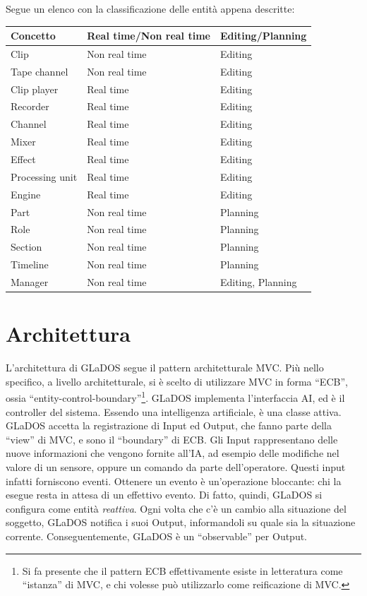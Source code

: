 \documentclass[a4paper,12pt]{report}
\begin{document}
Segue un elenco con la classificazione delle entità appena descritte:
\begin{center}
\begin{longtable}{| m{7em} | m{6cm} | m{5cm} |} 
 \hline
 Concetto & Real time/Non real time & Editing/Planning \\ [0.5ex] 
 \hline
 Clip & Non real time & Editing \\ 
 \hline
 Tape channel & Non real time & Editing \\
 \hline
 Clip player & Real time & Editing \\
 \hline
 Recorder & Real time & Editing \\
 \hline
 Channel & Real time & Editing \\ 
 \hline
 Mixer & Real time & Editing \\
 \hline 
 Effect & Real time & Editing \\
 \hline
 Processing unit & Real time & Editing \\
 \hline
 Engine & Real time & Editing \\
 \hline
 Part & Non real time & Planning \\
 \hline
 Role & Non real time & Planning \\
\hline
 Section & Non real time & Planning \\
\hline
 Timeline & Non real time & Planning \\
\hline
 Manager & Non real time & Editing, Planning \\
\hline
\end{longtable}
\end{center}


\section{Architettura}
L'architettura di GLaDOS segue il pattern architetturale MVC.
%
Più nello specifico, a livello architetturale, si è scelto di utilizzare MVC in forma ``ECB'', ossia ``entity-control-boundary''\footnote{
Si fa presente che il pattern ECB effettivamente esiste in letteratura come ``istanza'' di MVC, e chi volesse può utilizzarlo come reificazione di MVC.
}.
%
GLaDOS implementa l'interfaccia AI, ed è il controller del sistema.
Essendo una intelligenza artificiale, è una classe attiva.
%
GLaDOS accetta la registrazione di Input ed Output, che fanno parte della ``view'' di MVC, e sono il ``boundary'' di ECB.
Gli Input rappresentano delle nuove informazioni che vengono fornite all'IA, ad esempio delle modifiche nel valore di un sensore, oppure un comando da parte dell'operatore.
Questi input infatti forniscono eventi.
Ottenere un evento è un'operazione bloccante: chi la esegue resta in attesa di un effettivo evento.
Di fatto, quindi, GLaDOS si configura come entità \textit{reattiva}.
Ogni volta che c'è un cambio alla situazione del soggetto, GLaDOS notifica i suoi Output,
informandoli su quale sia la situazione corrente.
%
Conseguentemente, GLaDOS è un ``observable'' per Output.
\end{document}
